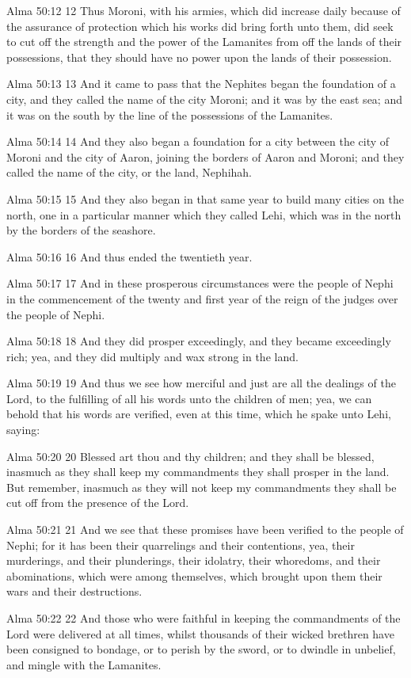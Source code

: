 Alma 50:12
 12 Thus Moroni, with his armies, which did increase daily
because of the assurance of protection which his works did bring
forth unto them, did seek to cut off the strength and the power
of the Lamanites from off the lands of their possessions, that
they should have no power upon the lands of their possession.

Alma 50:13
 13 And it came to pass that the Nephites began the foundation of
a city, and they called the name of the city Moroni; and it was
by the east sea; and it was on the south by the line of the
possessions of the Lamanites.

Alma 50:14
 14 And they also began a foundation for a city between the city
of Moroni and the city of Aaron, joining the borders of Aaron and
Moroni; and they called the name of the city, or the land,
Nephihah.

Alma 50:15
 15 And they also began in that same year to build many cities on
the north, one in a particular manner which they called Lehi,
which was in the north by the borders of the seashore.

Alma 50:16
 16 And thus ended the twentieth year.

Alma 50:17
 17 And in these prosperous circumstances were the people of
Nephi in the commencement of the twenty and first year of the
reign of the judges over the people of Nephi.

Alma 50:18
 18 And they did prosper exceedingly, and they became exceedingly
rich; yea, and they did multiply and wax strong in the land.

Alma 50:19
 19 And thus we see how merciful and just are all the dealings of
the Lord, to the fulfilling of all his words unto the children of
men; yea, we can behold that his words are verified, even at this
time, which he spake unto Lehi, saying:

Alma 50:20
 20 Blessed art thou and thy children; and they shall be blessed,
inasmuch as they shall keep my commandments they shall prosper in
the land.  But remember, inasmuch as they will not keep my
commandments they shall be cut off from the presence of the Lord.

Alma 50:21
 21 And we see that these promises have been verified to the
people of Nephi; for it has been their quarrelings and their
contentions, yea, their murderings, and their plunderings, their
idolatry, their whoredoms, and their abominations, which were
among themselves, which brought upon them their wars and their
destructions.

Alma 50:22
 22 And those who were faithful in keeping the commandments of
the Lord were delivered at all times, whilst thousands of their
wicked brethren have been consigned to bondage, or to perish by
the sword, or to dwindle in unbelief, and mingle with the
Lamanites.


